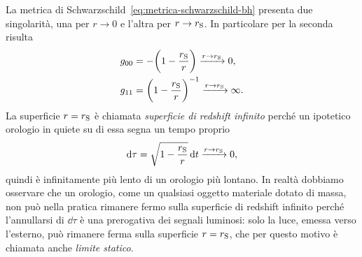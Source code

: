 La metrica di Schwarzschild~\eqref{eq:metrica-schwarzschild-bh} presenta due
singolarità, una per \(r \to 0\) e l'altra per \(r \to r_{\textup{S}}\).  In
particolare per la seconda risulta
\begin{subequations}
  \begin{align}
    g_{00} &= -\biggl(1 - \frac{r_{\textup{S}}}{r}\biggr) \xrightarrow{r\to
             r_{\textup{S}}} 0, \\
    g_{11} &= \biggl(1 - \frac{r_{\textup{S}}}{r}\biggr)^{-1} \xrightarrow{r\to
             r_{\textup{S}}} \infty.
  \end{align}
\end{subequations}
La superficie \(r = r_{\textup{S}}\) è chiamata \emph{superficie di redshift
  infinito} perché un ipotetico orologio in quiete su di essa segna un tempo
proprio
\begin{equation}
  \mathop{}\!\mathrm{d}\tau = \sqrt{1 - \frac{r_{\textup{S}}}{r}}\mathop{}\!\mathrm{d} t \xrightarrow{r\to
    r_{\textup{S}}} 0,
\end{equation}
quindi è infinitamente più lento di un orologio più lontano.  In realtà dobbiamo
osservare che un orologio, come un qualsiasi oggetto materiale dotato di massa,
non può nella pratica rimanere fermo sulla superficie di redshift infinito
perché l'annullarsi di \(\dd\tau\) è una prerogativa dei segnali luminosi: solo
la luce, emessa verso l'esterno, può rimanere ferma sulla superficie \(r =
r_{\textup{S}}\), che per questo motivo è chiamata anche \emph{limite statico}.

